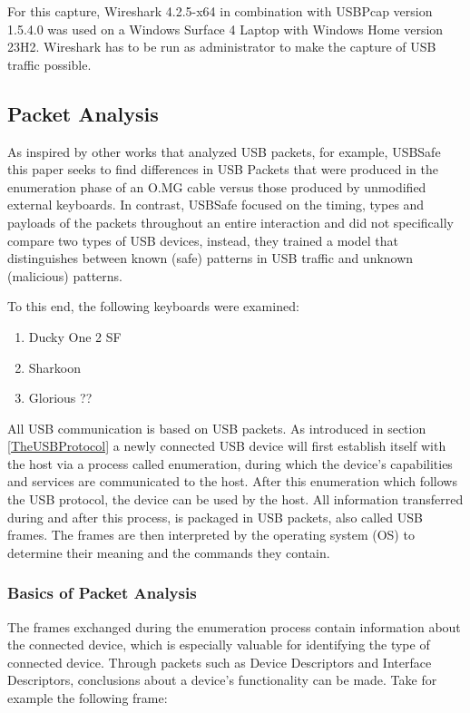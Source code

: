 For this capture, Wireshark 4.2.5-x64 in combination with USBPcap version 1.5.4.0 was used on a Windows Surface 4 Laptop with Windows Home version 23H2. Wireshark has to be run as administrator to make the capture of USB traffic possible.


\subsection{Packet Analysis}


As inspired by other works that analyzed USB packets, for example, USBSafe \cite{kharrazUSBESAFEEndPointSolution2019} this paper seeks to find differences in USB Packets that were produced in the enumeration phase of an O.MG cable versus those produced by unmodified external keyboards. In contrast, USBSafe focused on the timing, types and payloads of the packets throughout an entire interaction and did not specifically compare two types of USB devices, instead, they trained a model that distinguishes between known (safe) patterns in USB traffic and unknown (malicious) patterns. 

To this end, the following keyboards were examined:
\begin{enumerate}
    \item Ducky One 2 SF
    \item Sharkoon
    \item Glorious ??
\end{enumerate}


All USB communication is based on USB packets. As introduced in section \ref{TheUSBProtocol} a newly connected USB device will first establish itself with the host via a process called enumeration, during which the device's capabilities and services are communicated to the host. After this enumeration which follows the USB protocol, the device can be used by the host.
All information transferred during and after this process, is packaged in USB packets, also called USB frames. The frames are then interpreted by the operating system (OS) to determine their meaning and the commands they contain.



\subsubsection{Basics of Packet Analysis}

The frames exchanged during the enumeration process contain information about the connected device, which is especially valuable for identifying the type of connected device.
Through packets such as Device Descriptors and Interface Descriptors, conclusions about a device's functionality can be made. Take for example the following frame:

